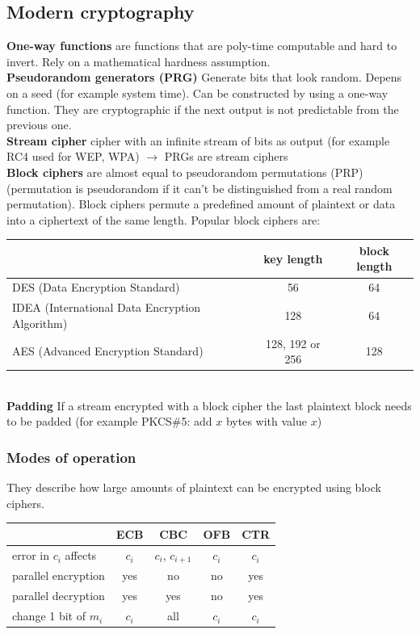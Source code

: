 \documentclass[12pt]{article}
\begin{document}
	\subsection{Modern cryptography}
	\textbf{One-way functions} are functions that are poly-time computable and hard to invert. Rely on a mathematical hardness assumption.\\
	\textbf{Pseudorandom generators (PRG)} Generate bits that look random. Depens on a seed (for example system time). Can be constructed by using a one-way function. They are cryptographic if the next output is not predictable from the previous one.\\
	\textbf{Stream cipher} cipher with an infinite stream of bits as output (for example RC4 used for WEP, WPA) $\rightarrow$ PRGs are stream ciphers\\
	\textbf{Block ciphers} are almost equal to pseudorandom permutations (PRP) (permutation is pseudorandom if it can't be distinguished from a real random permutation). Block ciphers permute a predefined amount of plaintext or data into a ciphertext of the same length. Popular block ciphers are:\\
	\begin{tabular}{|l|c|c|}
		\hline 
		& \textbf{key length} & \textbf{block length} \\ 
		\hline 
		DES (Data Encryption Standard) & 56 & 64 \\ 
		\hline 
		IDEA (International Data Encryption Algorithm) & 128 & 64 \\ 
		\hline 
		AES (Advanced Encryption Standard) & 128, 192 or 256 & 128 \\ 
		\hline 
	\end{tabular}\\
	\textbf{Padding} If a stream encrypted with a block cipher the last plaintext block needs to be padded (for example PKCS\#5: add $x$ bytes with value $x$)
	
	\subsubsection{Modes of operation}
	They describe how large amounts of plaintext can be encrypted using block ciphers.\\
	\begin{tabular}{|l|c|c|c|c|}
		\hline 
		& ECB & CBC & OFB & CTR \\ 
		\hline 
		error in $c_i$ affects & $c_i$ & $c_i$, $c_{i+1}$ & $c_i$ & $c_i$ \\ 
		\hline 
		parallel encryption & yes & no & no & yes \\ 
		\hline 
		parallel decryption & yes & yes & no & yes \\ 
		\hline 
		change 1 bit of $m_i$ & $c_i$ & all & $c_i$ & $c_i$ \\ 
		\hline 
	\end{tabular}
\end{document}
